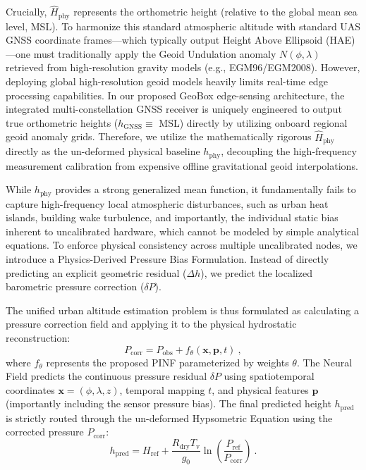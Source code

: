 Crucially, $\hat{H}_\text{phy}$ represents the orthometric height (relative to the global mean sea level, MSL). To harmonize this standard atmospheric altitude with standard UAS GNSS coordinate frames—which typically output Height Above Ellipsoid (HAE)—one must traditionally apply the Geoid Undulation anomaly $N(\phi, \lambda)$ retrieved from high-resolution gravity models (e.g., EGM96/EGM2008).
However, deploying global high-resolution geoid models heavily limits real-time edge processing capabilities. In our proposed GeoBox edge-sensing architecture, the integrated multi-constellation GNSS receiver is uniquely engineered to output true orthometric heights ($h_\text{GNSS} \equiv$ MSL) directly by utilizing onboard regional geoid anomaly grids. Therefore, we utilize the mathematically rigorous $\hat{H}_\text{phy}$ directly as the un-deformed physical baseline $h_\text{phy}$, decoupling the high-frequency measurement calibration from expensive offline gravitational geoid interpolations.

While $h_\text{phy}$ provides a strong generalized mean function, it fundamentally fails to capture high-frequency local atmospheric disturbances, such as urban heat islands, building wake turbulence, and importantly, the individual static bias inherent to uncalibrated hardware, which cannot be modeled by simple analytical equations. To enforce physical consistency across multiple uncalibrated nodes, we introduce a Physics-Derived Pressure Bias Formulation. Instead of directly predicting an explicit geometric residual ($\Delta h$), we predict the localized barometric pressure correction ($\delta P$).

The unified urban altitude estimation problem is thus formulated as calculating a pressure correction field and applying it to the physical hydrostatic reconstruction:
\begin{equation}
P_\text{corr} = P_\text{obs} + f_\theta(\mathbf{x}, \mathbf{p}, t) \ ,
\label{eq:pressure_correction}
\end{equation}
where $f_\theta$ represents the proposed PINF parameterized by weights $\theta$. The Neural Field predicts the continuous pressure residual $\delta P$ using spatiotemporal coordinates $\mathbf{x} = (\phi, \lambda, z)$, temporal mapping $t$, and physical features $\mathbf{p}$ (importantly including the sensor pressure bias). The final predicted height $h_\text{pred}$ is strictly routed through the un-deformed Hypsometric Equation using the corrected pressure $P_\text{corr}$:
\begin{equation}
h_\text{pred} = H_\text{ref} + \frac{R_\text{dry} T_\text{v}}{g_0} \ln\left(\frac{P_\text{ref}}{P_\text{corr}}\right) \ .
\label{eq:problem_formulation}
\end{equation}

